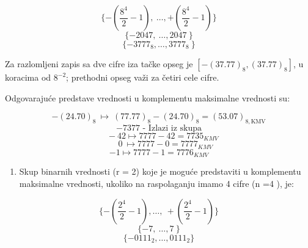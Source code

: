 \documentclass[a4paper,11pt]{article}
\numberwithin{equation}{section}
\begin{document}
\begin{equation}\label{eq:2.4.16}
\{ - \left( \frac{8^{4}}{2} - 1 \right),\ \ldots, + \left( \frac{8^{4}}{2} - 1 \right)\}
\end{equation}
\begin{equation}\label{eq:2.4.17}
\{ - 2047,\ \ldots,2047\ \}
\end{equation}
\begin{equation}\label{eq:2.4.18}
\{ - 3777_{8},\ldots,3777_{8}\ \}
\end{equation}

Za razlomljeni zapis sa dve cifre iza tačke opseg je $[-(37.77)_8,(37.77)_8]$, u koracima od $8^{-2}$; prethodni opseg važi za četiri cele cifre.\par

Odgovarajuće predstave vrednosti u komplementu maksimalne vrednosti su:



\begin{equation}\label{eq:2.4.19}
-(24.70)_8\ \longmapsto\ (77.77)_8-(24.70)_8=(53.07)_{8,\mathrm{KMV}}
\end{equation}
\begin{equation}\label{eq:2.4.20}
\text{\(- 7377\) - Izlazi iz skupa}
\end{equation}
\begin{equation}\label{eq:2.4.21}
\ \ \ \  - 42 \longmapsto 7777 - 42 = 7735_{KMV}
\end{equation}
\begin{equation}\label{eq:2.4.22}
\ \ \ \ \ \ \ 0\  \longmapsto 7777 - 0 = 7777_{KMV}
\end{equation}
\begin{equation}\label{eq:2.4.23}
-1 \longmapsto 7777 - 1 = 7776_{KMV}
\end{equation}


\begin{enumerate}[label=\alph*),start=4,leftmargin=*]
\item Skup binarnih vrednosti (r = 2) koje je moguće predstaviti u komplementu maksimalne vrednosti, ukoliko na raspolaganju imamo 4 cifre (n =4 ), je:

\end{enumerate}


\begin{equation}\label{eq:2.4.24}
\{ - \left( \frac{2^{4}}{2} - 1 \right),\ldots,\  + \left( \frac{2^{4}}{2} - 1 \right)\}
\end{equation}
\begin{equation}\label{eq:2.4.25}
\{ - 7,\ \ldots,7\ \}
\end{equation}
\begin{equation}\label{eq:2.4.26}
\{ - 0111_{2},\ldots,0111_{2}\}
\end{equation}
\end{document}
